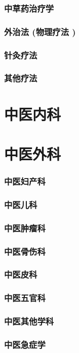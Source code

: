 \documentclass[UTF8]{../ApplicationUniverse}
\begin{document}
    \subsubsection{中草药治疗学}
    \subsubsection{外治法 (物理疗法 )}
    \subsubsection{针灸疗法}
    \subsubsection{其他疗法}
\section{中医内科}
\section{中医外科}
    \subsubsection{中医妇产科}
    \subsubsection{中医儿科}
    \subsubsection{中医肿瘤科}
    \subsubsection{中医骨伤科}
    \subsubsection{中医皮科}
    \subsubsection{中医五官科}
    \subsubsection{中医其他学科}
    \subsubsection{中医急症学}
\end{document}

